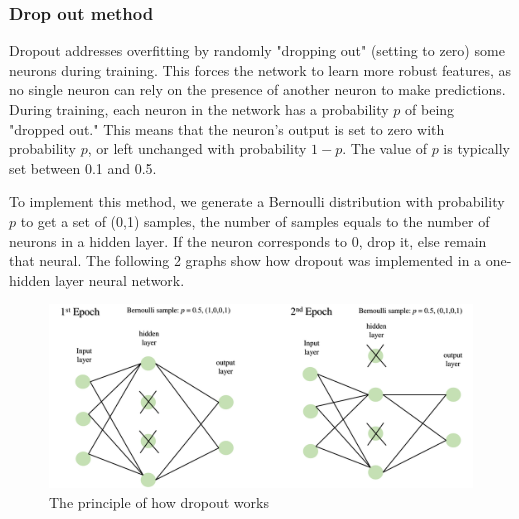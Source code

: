 \documentclass[
	9pt, %
]{beamer}
\begin{document}
\begin{frame}[allowframebreaks]
	\frametitle{Drop out method}
	Dropout addresses overfitting by randomly "dropping out" (setting to zero) some neurons during training. This forces the network to learn more robust features, as no single neuron can rely on the presence of another neuron to make predictions. During training, each neuron in the network has a probability $p$ of being "dropped out." This means that the neuron's output is set to zero with probability $p$, or left unchanged with probability $1-p$. The value of $p$ is typically set between 0.1 and 0.5.

To implement this method, we generate a Bernoulli distribution with probability $p$ to get a set of (0,1) samples, the number of samples equals to the number of neurons in a hidden layer. If the neuron corresponds to 0, drop it, else remain that neural. The following 2 graphs show how dropout was implemented in a one-hidden layer neural network.
\begin{figure}[H] %
\centering %
\includegraphics[width=1.0\textwidth]{dropout.pdf} %
\caption{The principle of how dropout works} %
\end{figure}
	

\end{frame}
\end{document}
